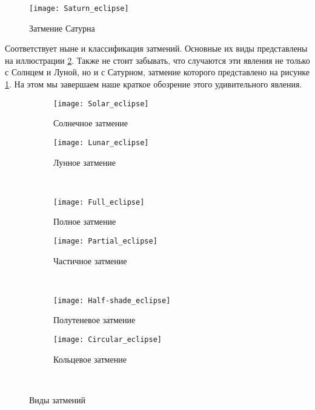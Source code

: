 \documentclass[30pt]{article}
\begin{document}
        \begin{figure}[h!]
            \centering
            \texttt{[image: Saturn\_eclipse]}
            \caption{Затмение Сатурна}
            \label{pic:saturn}
        \end{figure}
        
        \noindent Соответствует ныне и классификация затмений. Основные их виды представлены на иллюстрации \ref{pic:eclipses}. Также не стоит забывать, что случаются эти явления не только с Солнцем и Луной, но и с Сатурном, затмение которого представлено на рисунке \ref{pic:saturn}. На этом мы завершаем наше краткое обозрение этого удивительного явления.
        \begin{figure}[p]
            \centering
            \begin{subfigure}[b]{0.45\textwidth}
                \texttt{[image: Solar\_eclipse]}
                \caption{Солнечное затмение}
            \end{subfigure}
            \begin{subfigure}[b]{0.45\textwidth}
                \texttt{[image: Lunar\_eclipse]}
                \caption{Лунное затмение}
            \end{subfigure}\\
            \begin{subfigure}[b]{0.45\textwidth}
                \texttt{[image: Full\_eclipse]}
                \caption{Полное затмение}
            \end{subfigure}
            \begin{subfigure}[b]{0.45\textwidth}
                \texttt{[image: Partial\_eclipse]}
                \caption{Частичное затмение}
            \end{subfigure}\\
            \begin{subfigure}[b]{0.45\textwidth}
                \texttt{[image: Half-shade\_eclipse]}
                \caption{Полутеневое затмение}
            \end{subfigure}
            \begin{subfigure}[b]{0.45\textwidth}
                \texttt{[image: Circular\_eclipse]}
                \caption{Кольцевое затмение}
            \end{subfigure}\\
            \caption{Виды затмений}
            \label{pic:eclipses}
            
        \end{figure}\\
\end{document}
